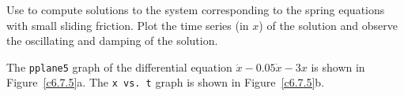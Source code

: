 \documentclass{ximera}
\begin{document}
\begin{exercise} \label{c6.7.5}
Use {\pplane} to compute solutions to the system corresponding to the
spring equations with small sliding friction.  Plot the time series (in $x$)
of the solution and observe the oscillating and damping of the solution.

\begin{solution}

The {\tt pplane5} graph of the differential equation
$\ddot{x} - 0.05\dot{x} - 3x$ is shown in Figure~\ref{c6.7.5}a.  The
{\tt x vs.\ t} graph is shown in Figure~\ref{c6.7.5}b.

\begin{figure}[htb]
                       \centerline{%
                       }
\end{figure}























\end{solution}
\end{exercise}
\end{document}
